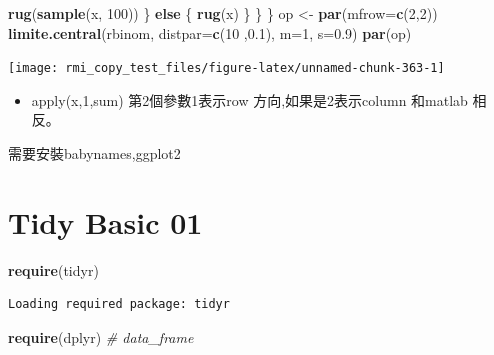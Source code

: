 \documentclass[]{book}
\newenvironment{Shaded}{\begin{snugshade}}{\end{snugshade}}
\newcommand{\CommentTok}[1]{\textcolor[rgb]{0.56,0.35,0.01}{\textit{#1}}}
\newcommand{\ControlFlowTok}[1]{\textcolor[rgb]{0.13,0.29,0.53}{\textbf{#1}}}
\newcommand{\DataTypeTok}[1]{\textcolor[rgb]{0.13,0.29,0.53}{#1}}
\newcommand{\DecValTok}[1]{\textcolor[rgb]{0.00,0.00,0.81}{#1}}
\newcommand{\FloatTok}[1]{\textcolor[rgb]{0.00,0.00,0.81}{#1}}
\newcommand{\KeywordTok}[1]{\textcolor[rgb]{0.13,0.29,0.53}{\textbf{#1}}}
\newcommand{\NormalTok}[1]{#1}
\newcommand{\StringTok}[1]{\textcolor[rgb]{0.31,0.60,0.02}{#1}}
\providecommand{\tightlist}{%
  \setlength{\itemsep}{0pt}\setlength{\parskip}{0pt}}
\theoremstyle{definition}
\theoremstyle{definition}
\theoremstyle{definition}
\theoremstyle{remark}
\begin{document}
\begin{Shaded}
\begin{Highlighting}[]
        \KeywordTok{rug}\NormalTok{(}\KeywordTok{sample}\NormalTok{(x, }\DecValTok{100}\NormalTok{))}
\NormalTok{      \} }\ControlFlowTok{else}\NormalTok{ \{}
        \KeywordTok{rug}\NormalTok{(x)}
\NormalTok{      \}}
\NormalTok{    \}}
\NormalTok{  \}}
\NormalTok{op <-}\StringTok{ }\KeywordTok{par}\NormalTok{(}\DataTypeTok{mfrow=}\KeywordTok{c}\NormalTok{(}\DecValTok{2}\NormalTok{,}\DecValTok{2}\NormalTok{))}
\KeywordTok{limite.central}\NormalTok{(rbinom, }\DataTypeTok{distpar=}\KeywordTok{c}\NormalTok{(}\DecValTok{10}\NormalTok{ ,}\FloatTok{0.1}\NormalTok{), }\DataTypeTok{m=}\DecValTok{1}\NormalTok{, }\DataTypeTok{s=}\FloatTok{0.9}\NormalTok{)}
\KeywordTok{par}\NormalTok{(op)}
\end{Highlighting}
\end{Shaded}

\begin{center}\texttt{[image: rmi\_copy\_test\_files/figure-latex/unnamed-chunk-363-1]} \end{center}

\begin{itemize}
\tightlist
\item
  apply(x,1,sum) 第2個參數1表示row 方向,如果是2表示column 和matlab
  相反。
\end{itemize}

\begin{Shaded}
\begin{Highlighting}[]
\NormalTok{需要安裝babynames,ggplot2}
\end{Highlighting}
\end{Shaded}

\hypertarget{tidy-basic-01}{%
\chapter{Tidy Basic 01}\label{tidy-basic-01}}

\begin{Shaded}
\begin{Highlighting}[]
\KeywordTok{require}\NormalTok{(tidyr)}
\end{Highlighting}
\end{Shaded}

\begin{verbatim}
Loading required package: tidyr
\end{verbatim}

\begin{Shaded}
\begin{Highlighting}[]
\KeywordTok{require}\NormalTok{(dplyr) }\CommentTok{# data_frame}
\end{Highlighting}
\end{Shaded}
\end{document}
